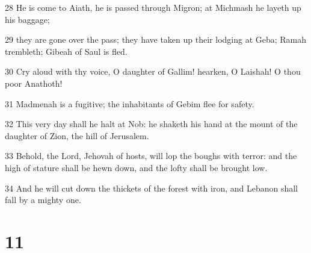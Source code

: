 \par 28 He is come to Aiath, he is passed through Migron; at Michmash he layeth up his baggage;
\par 29 they are gone over the pass; they have taken up their lodging at Geba; Ramah trembleth; Gibeah of Saul is fled.
\par 30 Cry aloud with thy voice, O daughter of Gallim! hearken, O Laishah! O thou poor Anathoth!
\par 31 Madmenah is a fugitive; the inhabitants of Gebim flee for safety.
\par 32 This very day shall he halt at Nob: he shaketh his hand at the mount of the daughter of Zion, the hill of Jerusalem.
\par 33 Behold, the Lord, Jehovah of hosts, will lop the boughs with terror: and the high of stature shall be hewn down, and the lofty shall be brought low.
\par 34 And he will cut down the thickets of the forest with iron, and Lebanon shall fall by a mighty one.

\chapter{11}

